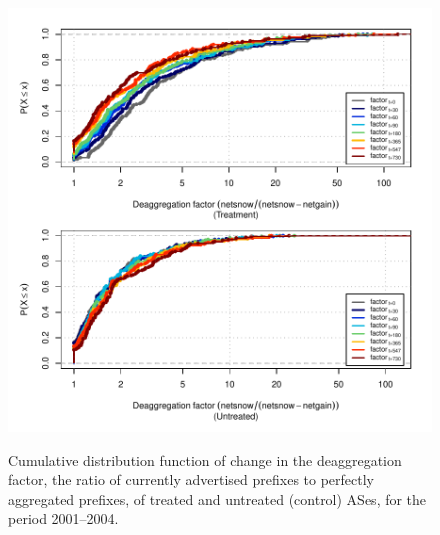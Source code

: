 \begin{figure}[H]
\begin{centering}
\begin{singlespace}
    \includegraphics[width=6in]{figures/behavior-deagg_factor-2001_2004-corr.pdf}
    \vspace{-2em}\\
    \caption{Cumulative distribution function of change in the deaggregation factor, the ratio of currently advertised prefixes to perfectly aggregated prefixes, of treated and untreated (control) ASes, for the period 2001--2004.}
\end{singlespace}
\end{centering}
\end{figure}
